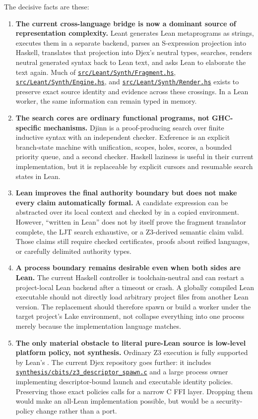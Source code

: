 \documentclass[10pt,letterpaper,oneside]{report}
\newcommand{\code}[1]{\texttt{\detokenize{#1}}}
\newcommand{\term}[1]{\textbf{#1}}
\def\LeantBase{https://github.com/VladimirReshetnikov/Leant/blob/89663ab01d24f61bc017b8c8b1f52c35573082e4/}
\def\DjexBase{https://github.com/VladimirReshetnikov/Djex/blob/43ec4f70b7540bbb76cb1bb72d9e5c4329cafe7f/}
\newcommand{\lpath}[1]{\href{\LeantBase#1}{\nolinkurl{#1}}}
\newcommand{\dpath}[1]{\href{\DjexBase#1}{\nolinkurl{#1}}}
\begin{document}
The decisive facts are these:

\begin{enumerate}
  \item \term{The current cross-language bridge is now a dominant source of representation complexity.} Leant generates Lean metaprograms as strings, executes them in a separate backend, parses an S-expression projection into Haskell, translates that projection into Djex's neutral types, searches, renders neutral generated syntax back to Lean text, and asks Lean to elaborate the text again. Much of \lpath{src/Leant/Synth/Fragment.hs}, \lpath{src/Leant/Synth/Engine.hs}, and \lpath{src/Leant/Synth/Render.hs} exists to preserve exact source identity and evidence across these crossings. In a Lean worker, the same information can remain typed in memory.

  \item \term{The search cores are ordinary functional programs, not GHC-specific mechanisms.} Djinn is a proof-producing search over finite inductive syntax with an independent checker. Exference is an explicit branch-state machine with unification, scopes, holes, scores, a bounded priority queue, and a second checker. Haskell laziness is useful in their current implementation, but it is replaceable by explicit cursors and resumable search states in Lean.

  \item \term{Lean improves the final authority boundary but does not make every claim automatically formal.} A candidate expression can be abstracted over its local context and checked by \code{Kernel.Environment.addDecl} in a copied environment. However, ``written in Lean'' does not by itself prove the fragment translator complete, the LJT search exhaustive, or a Z3-derived semantic claim valid. Those claims still require checked certificates, proofs about reified languages, or carefully delimited authority types.

  \item \term{A process boundary remains desirable even when both sides are Lean.} The current Haskell controller is toolchain-neutral and can restart a project-local Lean backend after a timeout or crash. A globally compiled Lean executable should not directly load arbitrary project \code{.olean} files from another Lean version. The replacement should therefore spawn or build a worker under the target project's Lake environment, not collapse everything into one process merely because the implementation language matches.

  \item \term{The only material obstacle to literal pure-Lean source is low-level platform policy, not synthesis.} Ordinary Z3 execution is fully supported by Lean's \code{IO.Process.spawn}. The current Djex repository goes further: it includes \dpath{synthesis/cbits/z3_descriptor_spawn.c} and a large process owner implementing descriptor-bound launch and executable identity policies. Preserving those exact policies calls for a narrow C FFI layer. Dropping them would make an all-Lean implementation possible, but would be a security-policy change rather than a port.
\end{enumerate}
\end{document}
